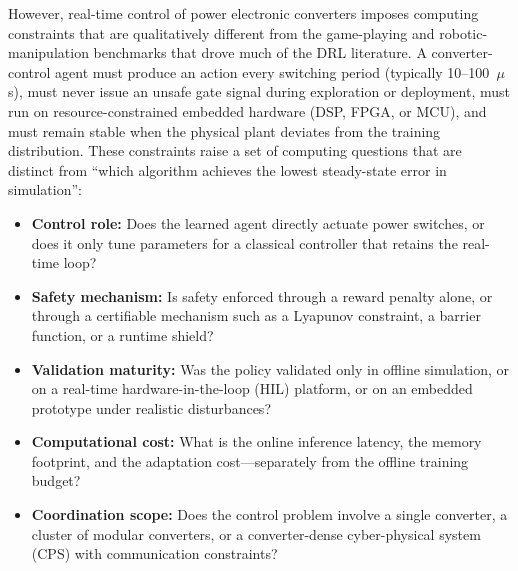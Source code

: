 \documentclass[manuscript,screen,review]{acmart}
\begin{document}
However, real-time control of power electronic converters imposes computing constraints that are qualitatively different from the game-playing and robotic-manipulation benchmarks that drove much of the DRL literature.
A converter-control agent must produce an action every switching period (typically 10--100~$\mu$s), must never issue an unsafe gate signal during exploration or deployment, must run on resource-constrained embedded hardware (DSP, FPGA, or MCU), and must remain stable when the physical plant deviates from the training distribution.
These constraints raise a set of computing questions that are distinct from ``which algorithm achieves the lowest steady-state error in simulation'':
\begin{itemize}
  \item \textbf{Control role:} Does the learned agent directly actuate power switches, or does it only tune parameters for a classical controller that retains the real-time loop?
  \item \textbf{Safety mechanism:} Is safety enforced through a reward penalty alone, or through a certifiable mechanism such as a Lyapunov constraint, a barrier function, or a runtime shield?
  \item \textbf{Validation maturity:} Was the policy validated only in offline simulation, or on a real-time hardware-in-the-loop (HIL) platform, or on an embedded prototype under realistic disturbances?
  \item \textbf{Computational cost:} What is the online inference latency, the memory footprint, and the adaptation cost---separately from the offline training budget?
  \item \textbf{Coordination scope:} Does the control problem involve a single converter, a cluster of modular converters, or a converter-dense cyber-physical system (CPS) with communication constraints?
\end{itemize}
\end{document}
